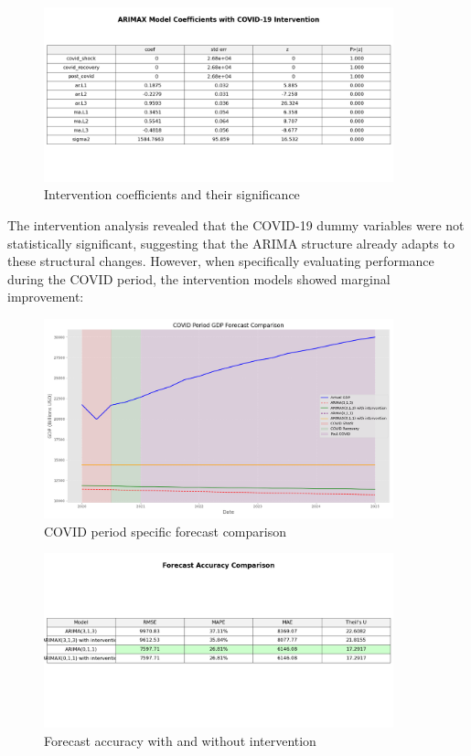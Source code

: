 \documentclass[11pt,a4paper]{article}
\begin{document}
\begin{figure}[H]
    \centering
    \includegraphics[width=0.9\textwidth]{plots/arima/gdp/intervention/intervention_coefficients.png}
    \caption{Intervention coefficients and their significance}
    \label{fig:intervention_coef}
\end{figure}

The intervention analysis revealed that the COVID-19 dummy variables were not statistically significant, suggesting that the ARIMA structure already adapts to these structural changes. However, when specifically evaluating performance during the COVID period, the intervention models showed marginal improvement:

\begin{figure}[H]
    \centering
    \includegraphics[width=0.9\textwidth]{plots/arima/gdp/intervention/covid_period_forecast.png}
    \caption{COVID period specific forecast comparison}
    \label{fig:covid_forecast}
\end{figure}

\begin{figure}[H]
    \centering
    \includegraphics[width=0.9\textwidth]{plots/arima/gdp/intervention/accuracy_metrics_comparison.png}
    \caption{Forecast accuracy with and without intervention}
    \label{fig:intervention_accuracy}
\end{figure}
\end{document}
